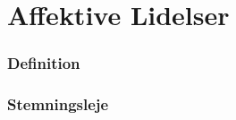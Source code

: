\section{Affektive Lidelser}

\begin{frame}
\frametitle{Definition}

\end{frame}

\begin{frame}
\frametitle{Stemningsleje}

\end{frame}
